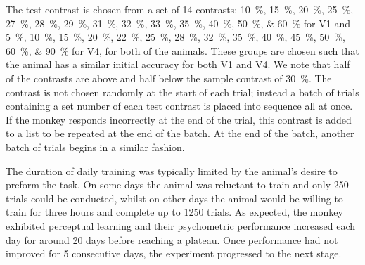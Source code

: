 The test contrast is chosen from a set of 14 contrasts:
\SIlist[list-units = brackets]{10;15;20;25;27;28;29;31;32;33;35;40;50;60}{\percent} for \ac{V1} and
\SIlist[list-units = brackets]{5;10;15;20;22;25;28;32;35;40;45;50;60;90}{\percent} for \ac{V4},
for both of the animals.
These groups are chosen such that the animal has a similar initial accuracy for both \ac{V1} and \ac{V4}.
We note that half of the contrasts are above and half below the sample contrast of \SI{30}{\percent}.
The contrast is not chosen randomly at the start of each trial; instead a batch of trials containing a set number of each test contrast is placed into sequence all at once.
If the monkey responds incorrectly at the end of the trial, this contrast is added to a list to be repeated at the end of the batch.
At the end of the batch, another batch of trials begins in a similar fashion.

The duration of daily training was typically limited by the animal's desire to preform the task.
On some days the animal was reluctant to train and only 250 trials could be conducted, whilst on other days the animal would be willing to train for three hours and complete up to 1250 trials.
As expected, the monkey exhibited perceptual learning and their psychometric performance increased each day for around 20 days before reaching a plateau.
Once performance had not improved for 5 consecutive days, the experiment progressed to the next stage.


